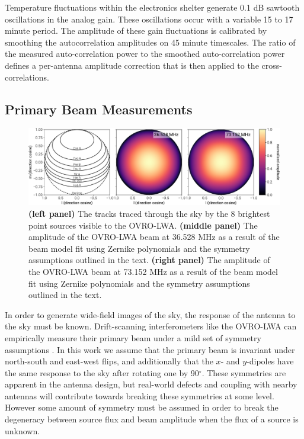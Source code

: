 \documentclass[twocolumn]{aastex61}
\begin{document}
Temperature fluctuations within the electronics shelter generate 0.1 dB sawtooth oscillations in the
analog gain. These oscillations occur with a variable 15 to 17 minute period. The amplitude of these
gain fluctuations is calibrated by smoothing the autocorrelation amplitudes on 45 minute timescales.
The ratio of the measured auto-correlation power to the smoothed auto-correlation power defines a
per-antenna amplitude correction that is then applied to the cross-correlations.

\subsection{Primary Beam Measurements}

\begin{figure}[t]
    \includegraphics[width=\textwidth]{figures/beam/beam}
    \caption{
        \textbf{(left panel)}
        The tracks traced through the sky by the 8 brightest point sources visible to the
        OVRO-LWA.
        \textbf{(middle panel)}
        The amplitude of the OVRO-LWA beam at 36.528 MHz as a result of the beam model
        fit using Zernike polynomials and the symmetry assumptions outlined in the text.
        \textbf{(right panel)}
        The amplitude of the OVRO-LWA beam at 73.152 MHz as a result of the beam model
        fit using Zernike polynomials and the symmetry assumptions outlined in the text.
    }
    \label{fig:beam}
\end{figure}

In order to generate wide-field images of the sky, the response of the antenna to the sky must be
known. Drift-scanning interferometers like the OVRO-LWA can empirically measure their
primary beam under a mild set of symmetry assumptions \citep{2012AJ....143...53P}. In this work we
assume that the primary beam is invariant under north-south and east-west flips, and additionally
that the $x$- and $y$-dipoles have the same response to the sky after rotating one by 90$^\circ$.
These symmetries are apparent in the antenna design, but real-world defects and coupling with nearby
antennas will contribute towards breaking these symmetries at some level. However some amount of
symmetry must be assumed in order to break the degeneracy between source flux and beam amplitude
when the flux of a source is unknown.
\end{document}
